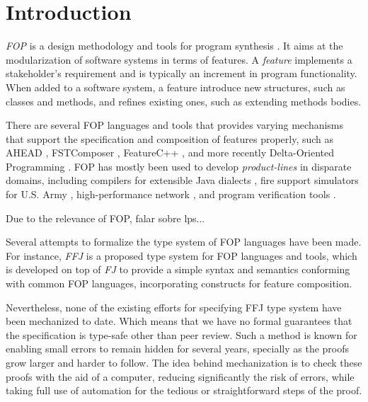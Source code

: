 
\section{Introduction}
\textit{\acf{FOP}} \cite{prehofer_feature-oriented_1997} is a design methodology and tools for program synthesis \cite{batory_tutorial_2003}.
It aims at the modularization of software systems in terms of features. A \textit{feature}
implements a stakeholder's requirement and is typically an increment in program functionality.
When added to a software system, a feature introduce new structures, such as classes and methods,
and refines existing ones, such as extending methods bodies.

There are several \ac{FOP} languages and tools that provides varying mechanisms
that support the specification and composition of features properly, such as AHEAD \cite{batory_feature-oriented_2004},
FSTComposer \cite{apel_superimposition:_2008}, FeatureC++ \cite{apel_featurec++:_2005}, and more recently Delta-Oriented Programming \cite{schaefer_delta-oriented_2010}. \ac{FOP} has mostly been used to develop
\textit{product-lines} in disparate domains, including compilers for extensible Java dialects 
\cite{batory_jts:_1998}, fire support simulators for U.S. Army \cite{batory_achieving_2000}, high-performance network
\cite{batory_design_1992}, and program verification tools \cite{kurt_stirewalt_component-based_2001}.

Due to the relevance of \ac{FOP}, falar sobre lps...

Several attempts to formalize the type system of \ac{FOP} languages have been made. %
For instance,  \textit{\acf{FFJ}} \cite{apel_feature_2008} is a proposed type system for \ac{FOP} languages and tools, 
which is developed on top of \textit{\acf{FJ}} \cite{igarashi_featherweight_2001}
to provide a simple syntax and semantics conforming with common \ac{FOP} languages, 
incorporating constructs for feature composition. %

Nevertheless, none of the existing efforts for specifying \ac{FFJ} type system have been mechanized to date.
Which means that we have no formal guarantees that the specification is type-safe other than peer review. 
Such a method is known for enabling small errors to remain hidden for several years, specially as the proofs grow larger and harder to follow.
The idea behind mechanization is to check these proofs with the aid of a computer, reducing significantly the risk of errors, while 
taking full use of automation for the tedious or straightforward steps of the proof.

